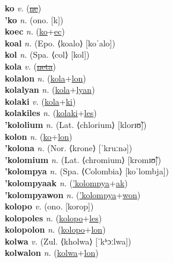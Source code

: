 \textbf{ko} \textit{v.} (\hyperref[ne]{\sout{ne}})
 \label{ko} \\
\textbf{'ko} \textit{n.} (ono. [k])
 \label{'ko} \\
\textbf{koec} \textit{n.} (\hyperref[ko]{ko}+\hyperref[ec]{ec})
 \label{koec} \\
\textbf{koal} \textit{n.} (Epo. ⟨koalo⟩ [koˈalo])
 \label{koal} \\
\textbf{kol} \textit{n.} (Spa. ⟨col⟩ [kol])
 \label{kol} \\
\textbf{kola} \textit{v.} (\hyperref[neta]{\sout{neta}})
 \label{kola} \\
\textbf{kolalon} \textit{n.} (\hyperref[kola]{kola}+\hyperref[lon]{lon})
 \label{kolalon} \\
\textbf{kolalyan} \textit{n.} (\hyperref[kola]{kola}+\hyperref[lyan]{lyan})
 \label{kolalyan} \\
\textbf{kolaki} \textit{v.} (\hyperref[kola]{kola}+\hyperref[ki]{ki})
 \label{kolaki} \\
\textbf{kolakiles} \textit{n.} (\hyperref[kolaki]{kolaki}+\hyperref[les]{les})
 \label{kolakiles} \\
\textbf{'kololium} \textit{n.} (Lat. ⟨chlorium⟩ [klorɪʊ̃])
 \label{'kololium} \\
\textbf{kolon} \textit{n.} (\hyperref[ko]{ko}+\hyperref[lon]{lon})
 \label{kolon} \\
\textbf{'kolona} \textit{n.} (Nor. ⟨krone⟩ [ˈkruːnə])
 \label{'kolona} \\
\textbf{'kolomium} \textit{n.} (Lat. ⟨chromium⟩ [kromɪʊ̃])
 \label{'kolomium} \\
\textbf{'kolompya} \textit{n.} (Spa. ⟨Colombia⟩ [koˈlombja])
 \label{'kolompya} \\
\textbf{'kolompyaak} \textit{n.} (\hyperref['kolompya]{'kolompya}+\hyperref[ak]{ak})
 \label{'kolompyaak} \\
\textbf{'kolompyawon} \textit{n.} (\hyperref['kolompya]{'kolompya}+\hyperref[won]{won})
 \label{'kolompyawon} \\
\textbf{kolopo} \textit{v.} (ono. [korop])
 \label{kolopo} \\
\textbf{kolopoles} \textit{n.} (\hyperref[kolopo]{kolopo}+\hyperref[les]{les})
 \label{kolopoles} \\
\textbf{kolopolon} \textit{n.} (\hyperref[kolopo]{kolopo}+\hyperref[lon]{lon})
 \label{kolopolon} \\
\textbf{kolwa} \textit{v.} (Zul. ⟨kholwa⟩ [ˈkʰɔːlwa])
 \label{kolwa} \\
\textbf{kolwalon} \textit{n.} (\hyperref[kolwa]{kolwa}+\hyperref[lon]{lon})
